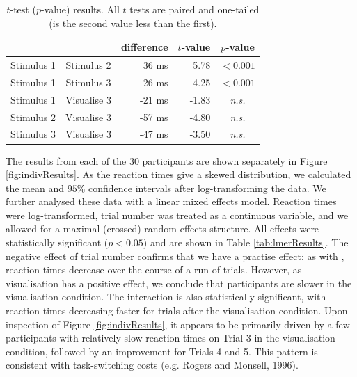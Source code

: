 \documentclass[smallextended]{svjour3}       %
\begin{document}
\begin{table}
\centering
\small
\caption{$t$-test ($p$-value) results. All $t$ tests are paired and one-tailed (is the second value less than the first).}
\label{tab:ttestResults}
\begin{tabular}{cc|rrc}
 &			& difference & $t$-value & $p$-value \\
 	\hline
Stimulus 1 & Stimulus 2 	&	36 ms		& 5.78	& $<0.001$\\
Stimulus 1 & Stimulus 3		&	26 ms		& 4.25	& $<0.001$\\
\hline
Stimulus 1 & Visualise 3 	&	-21 ms		& -1.83 & \textit{n.s.}	\\
Stimulus 2 & Visualise 3 	&	-57 ms		& -4.80 & \textit{n.s.}	\\
Stimulus 3 & Visualise 3 	&	-47 ms		& -3.50 & \textit{n.s.}	\\
\end{tabular}
\end{table}

The results from each of the 30 participants are shown separately in Figure \ref{fig:indivResults}. As the reaction times give a skewed distribution, we calculated the mean and $95\%$ confidence intervals after log-transforming the data. We further analysed these data with a linear mixed effects model. Reaction times were log-transformed, trial number was treated as a continuous variable, and we allowed for a maximal (crossed) random effects structure. All effects were statistically significant ($p<0.05$) and are shown in Table \ref{tab:lmerResults}. The negative effect of trial number confirms that we have a practise effect: as with \cite{reinhart2015}, reaction times decrease over the course of a run of trials. However, as visualisation has a positive effect, we conclude that participants are slower in the visualisation condition. The interaction is also statistically significant, with reaction times decreasing faster for trials after the visualisation condition. Upon inspection of Figure \ref{fig:indivResults}, it appears to be primarily driven by a few participants with relatively slow reaction times on Trial 3 in the visualisation condition, followed by an improvement for Trials 4 and 5. This pattern is consistent with task-switching costs (e.g. Rogers and Monsell, 1996).
\end{document}
